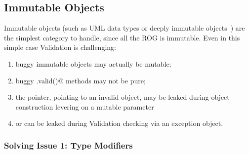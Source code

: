 \subsection{Immutable Objects}
\label{s:immutable}
\saveSpace
Immutable objects (such as UML data types or deeply immutable objects~\cite{Potanin2013}) are the simplest category to handle, since all the ROG is immutable.
Even in this simple case Validation is challenging:
\begin{enumerate}
  \item buggy immutable objects may actually be mutable;
  \item buggy \Q@.valid()@ methods may not be pure;
  \item the \Q@this@ pointer, pointing to an invalid object, may be leaked during object
 construction levering on a mutable parameter
\item or can be leaked during Validation checking via an exception object.
\end{enumerate}

\subsubsection*{Solving Issue 1: Type Modifiers}

